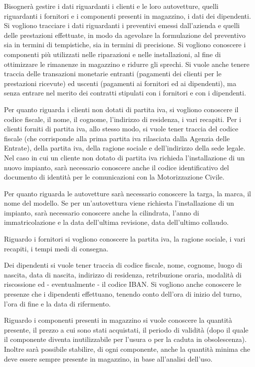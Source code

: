 		Bisognerà gestire i dati riguardanti i clienti e le loro autovetture, quelli riguardanti i fornitori e i componenti presenti in magazzino, i dati dei dipendenti. Si vogliono tracciare i dati riguardanti i preventivi emessi dall’azienda e quelli delle prestazioni effettuate, in modo da agevolare la formulazione del preventivo sia in termini di tempistiche, sia in termini di precisione. Si vogliono conoscere i componenti più utilizzati nelle riparazioni e nelle installazioni, al fine di ottimizzare le rimanenze in magazzino e ridurre gli sprechi. Si vuole anche tenere traccia delle transazioni monetarie entranti (pagamenti dei clienti per le prestazioni ricevute) ed uscenti (pagamenti ai fornitori ed ai dipendenti), ma senza entrare nel merito dei contratti stipulati con i fornitori e con i dipendenti.
		
		Per quanto riguarda i clienti non dotati di partita iva, si vogliono conoscere il codice fiscale, il nome, il cognome, l’indirizzo di residenza, i vari recapiti. Per i clienti forniti di partita iva, allo stesso modo, si vuole tener traccia del codice fiscale (che corrisponde alla prima partita iva rilasciata dalla Agenzia delle Entrate), della partita iva, della ragione sociale e dell’indirizzo della sede legale. Nel caso in cui un cliente non dotato di partita iva richieda l’installazione di un nuovo impianto, sarà necessario conoscere anche il codice identificativo del documento di identità per le comunicazioni con la Motorizzazione Civile. 
		
		Per quanto riguarda le autovetture sarà necessario conoscere la targa, la marca, il nome del modello. Se per un’autovettura viene richiesta l’installazione di un impianto, sarà necessario conoscere anche la cilindrata, l’anno di immatricolazione e la data dell’ultima revisione, data dell’ultimo collaudo. 
		
		Riguardo i fornitori si vogliono conoscere la partita iva, la ragione sociale, i vari recapiti, i tempi medi di consegna. 
		
		Dei dipendenti si vuole tener traccia di codice fiscale, nome, cognome, luogo di nascita, data di nascita, indirizzo di residenza, retribuzione oraria, modalità di riscossione ed - eventualmente - il codice IBAN. Si vogliono anche conoscere le presenze che i dipendenti effettuano, tenendo conto dell’ora di inizio del turno, l’ora di fine e la data di rifermento.
		
		Riguardo i componenti presenti in magazzino si vuole conoscere la quantità presente, il prezzo a cui sono stati acquistati, il periodo di validità (dopo il quale il componente diventa inutilizzabile per l’usura o per la caduta in obsolescenza). Inoltre sarà possibile stabilire, di ogni componente, anche la quantità minima che deve essere sempre presente in magazzino, in base all’analisi dell’uso. 
		
